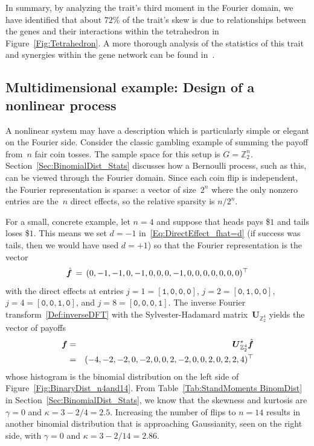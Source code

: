 \documentclass[letterpaper,11pt]{article}
\newcommand{\bs}[1]{{\boldsymbol{#1}}}
\newcommand{\gr}[1]{( #1 )}
\newcommand{\vect}[1]{[ #1 ]}
\newcommand{\Int}{\mathbb Z}
\newcommand{\bcode}[1]{\texttt{#1}}
\newcommand{\hatbsf}{{\kern+0.25em}\hat{{\kern-0.25em}\bs{f}}}
\theoremstyle{definition} \newtheorem{remark}{Remark}
\begin{document}
In summary, by analyzing the trait's third moment in the Fourier domain, we have identified that about $72\%$ of the trait's skew is due to relationships between the genes and their interactions within the tetrahedron in Figure~\ref{Fig:Tetrahedron}. A more thorough analysis of the statistics of this trait and synergies within the gene network can be found in~\cite{herman2026networkSynergiesFourier}.

\subsection{Multidimensional example: Design of a nonlinear process} \label{Sec:Design_DFT_example}
A nonlinear system may have a description which is particularly simple or elegant on the Fourier side. Consider the classic gambling example of summing the payoff from~$n$ fair coin tosses. The sample space for this setup is $G=\Int_2^n$. Section~\ref{Sec:BinomialDist_Stats} discusses how a Bernoulli process, such as this, can be viewed through the Fourier domain. Since each coin flip is independent, the Fourier representation is sparse: a vector of size~$2^n$ where the only nonzero entries are the~$n$ direct effects, so the relative sparsity is $n/2^n$.

For a small, concrete example, let $n=4$ and suppose that heads pays \$$1$ and tails loses \$$1$. This means we set $d=-1$ in~\eqref{Eq:DirectEffect_fhat=d} (if success was tails, then we would have used $d=+1$) so that the Fourier representation is the vector
$$
\hatbsf \,=\, \gr{0,-1,-1,0,-1,0,0,0,-1,0,0,0,0,0,0,0}^\top
$$
with the direct effects at entries $j=1=\vect{\bcode{1},\bcode{0},\bcode{0},\bcode{0}}$, $j=2=\vect{\bcode{0},\bcode{1},\bcode{0},\bcode{0}}$, $j=4=\vect{\bcode{0},\bcode{0},\bcode{1},\bcode{0}}$, and $j=8=\vect{\bcode{0},\bcode{0},\bcode{0},\bcode{1}}$. The inverse Fourier transform~\eqref{Def:inverseDFT} with the Sylvester-Hadamard matrix~$\bs{U}_{\Int_2^4}$ yields the vector of payoffs
\begin{eqnarray*}
\bs{f} &=& \bs{U}_{\Int_2^4}^*\hatbsf \\
&=& \gr{-4, -2, -2, 0, -2, 0, 0, 2, -2, 0, 0, 2, 0, 2, 2, 4}^\top
\end{eqnarray*}
whose histogram is the binomial distribution on the left side of Figure~\ref{Fig:BinaryDist_n4and14}. From Table~\ref{Tab:StandMoments BinomDist} in Section~\ref{Sec:BinomialDist_Stats}, we know that the skewness and kurtosis are $\gamma=0$ and $\kappa = 3-2/4 = 2.5$. Increasing the number of flips to $n = 14$ results in another binomial distribution that is approaching Gaussianity, seen on the right side, with $\gamma=0$ and $\kappa = 3-2/14 = 2.86$.
\end{document}
